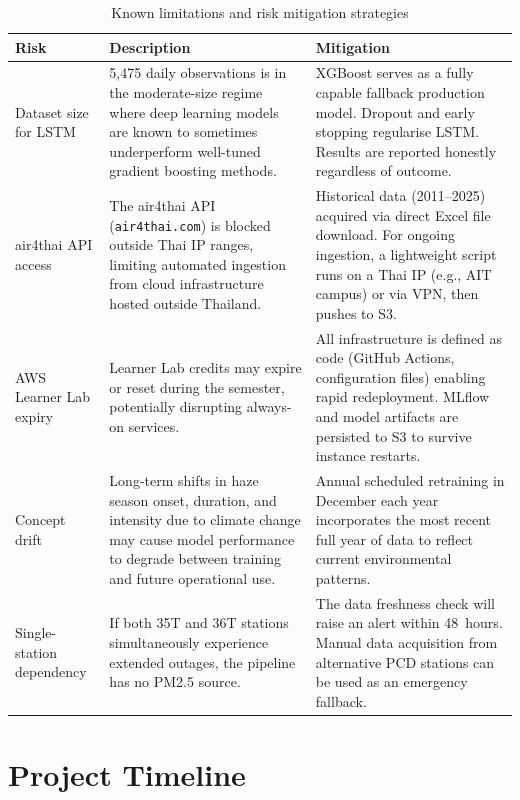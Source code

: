 \documentclass[12pt,a4paper]{report}
\begin{document}
\begin{table}[H]
\centering
\caption{Known limitations and risk mitigation strategies}
\label{tab:risks}
\begin{tabularx}{\textwidth}{@{}lXX@{}}
\toprule
\textbf{Risk} & \textbf{Description} & \textbf{Mitigation} \\
\midrule
Dataset size for LSTM &
  5,475 daily observations is in the moderate-size regime where deep learning models are known to sometimes underperform well-tuned gradient boosting methods. &
  XGBoost serves as a fully capable fallback production model. Dropout and early stopping regularise LSTM. Results are reported honestly regardless of outcome. \\[6pt]

air4thai API access &
  The air4thai API (\texttt{air4thai.com}) is blocked outside Thai IP ranges, limiting automated ingestion from cloud infrastructure hosted outside Thailand. &
  Historical data (2011--2025) acquired via direct Excel file download. For ongoing ingestion, a lightweight script runs on a Thai IP (e.g., AIT campus) or via VPN, then pushes to S3. \\[6pt]

AWS Learner Lab expiry &
  Learner Lab credits may expire or reset during the semester, potentially disrupting always-on services. &
  All infrastructure is defined as code (GitHub Actions, configuration files) enabling rapid redeployment. MLflow and model artifacts are persisted to S3 to survive instance restarts. \\[6pt]

Concept drift &
  Long-term shifts in haze season onset, duration, and intensity due to climate change may cause model performance to degrade between training and future operational use. &
  Annual scheduled retraining in December each year incorporates the most recent full year of data to reflect current environmental patterns. \\[6pt]

Single-station dependency &
  If both 35T and 36T stations simultaneously experience extended outages, the pipeline has no PM2.5 source. &
  The data freshness check will raise an alert within 48~hours. Manual data acquisition from alternative PCD stations can be used as an emergency fallback. \\
\bottomrule
\end{tabularx}
\end{table}

\section{Project Timeline}
\end{document}
